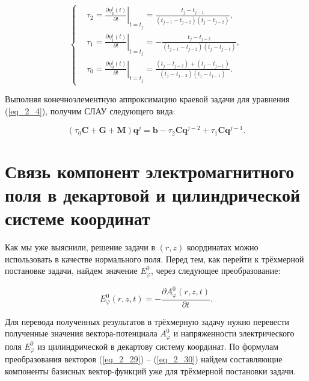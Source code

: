 \begin{equation} \label{eq_2_24}
	\begin{cases}
		& \tau_2 = \left.\frac{\partial \eta_2^j(t)}{\partial t}\right|_{t=t_j} = \frac{t_j - t_{j-1}}{(t_{j-1} - t_{j-2}) (t_j - t_{j-2})}, \\
		
		& \tau_1 = \left.\frac{\partial \eta_1^j(t)}{\partial t}\right|_{t=t_j} = -\frac{t_j - t_{j-2}}{(t_{j-1} - t_{j-2}) (t_j - t_{j-1})}, \\
		
		& \tau_0 = \left.\frac{\partial \eta_0^j(t)}{\partial t}\right|_{t=t_j} = \frac{(t_j - t_{j-2}) + (t_{j} - t_{j-1})}{(t_{j} - t_{j-2}) (t_j - t_{j-1})}.
	\end{cases}
\end{equation}


Выполняя конечноэлементную аппроксимацию краевой задачи для уравнения (\ref{eq_2_4}), получим СЛАУ следующего вида:

\begin{equation} \label{eq_2_27}
	\left(\tau_0 \textbf{C} + \textbf{G} + \textbf{M}\right) \textbf{q}^j = \textbf{b} - \tau_2 \textbf{C} \textbf{q}^{j-2} + \tau_1 \textbf{C} \textbf{q}^{j-1}.
\end{equation}

\section{Связь компонент электромагнитного поля в декартовой и цилиндрической системе координат}

Как мы уже выяснили, решение задачи в $(r, z)$ координатах можно использовать в качестве нормального поля. Перед тем, как перейти к трёхмерной постановке задачи, найдем значение $E^0_{\varphi}$, через следующее преобразование:

\begin{equation} \label{eq_2_28}
	E^0_{\varphi}(r, z, t) = -\frac{\partial A^0_{\varphi}(r, z, t)}{\partial t}.
\end{equation}

Для перевода полученных результатов в трёхмерную задачу нужно перевести полученные значения вектора-потенциала $A^0_{\varphi}$ и напряженности электрического поля  $E^0_{\varphi}$ из цилиндрической в декартову систему координат. По формулам преобразования векторов (\ref{eq_2_29}) -- (\ref{eq_2_30}) найдем составляющие компоненты базисных вектор-функций уже для трёхмерной постановки задачи.

